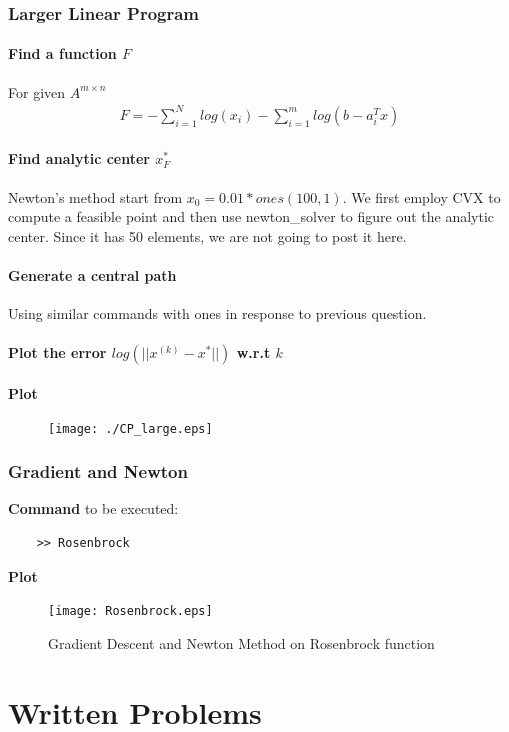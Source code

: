 \documentclass[11pt,a4paper]{article}
\begin{document}
\newpage
\section{Larger Linear Program}
\subsection{Find a function $F$}
For given $A^{m \times n}$
\begin{align}
    F = -\sum_{i=1}^N log(x_i) - \sum_{i=1}^{m} log (b - a_i^T x)
\end{align}

\subsection{Find analytic center $x_F^*$}
Newton's method start from $x_0 = 0.01 * ones(100, 1)$.
We first employ CVX to compute a feasible point and then use newton\_solver to
figure out the analytic center. Since it has 50 elements, we are not going to
post it here.

\subsection{Generate a central path}
Using similar commands with ones in response to previous question.

\subsection{Plot the error $log(|| x^{(k)} - x^*|| )$ w.r.t $k$}
{\bf Plot}
\begin{figure}[h]
    \centering
    \texttt{[image: ./CP\_large.eps]}
\end{figure}

\newpage
\section{Gradient and Newton}
{\bf Command} to be executed:
\begin{verbatim}
    >> Rosenbrock
\end{verbatim}

\noindent
{\bf Plot}
\begin{figure}[h]
    \centering
    \texttt{[image: Rosenbrock.eps]}
    \caption{Gradient Descent and Newton Method on Rosenbrock function }
\end{figure}

\newpage
\part{Written Problems}
\end{document}

